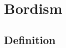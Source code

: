 \documentclass[Total.tex]{subfiles}
\begin{document}
	\chapter{Bordism}
		\section{Definition}
\end{document}
